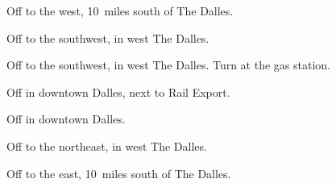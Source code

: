 

\begin{LocationList}

Off  to the west, 10~miles south of The Dalles.

\Location{\GasStation \Gas \Rest}
Off   to the southwest, in west The Dalles.

Off   to the southwest, in west The Dalles.
Turn at the gas station.

Off  in downtown Dalles, next to Rail Export.

Off  in downtown Dalles.

Off   to the northeast, in west The Dalles.

Off  to the east, 10~miles south of The Dalles.

\end{LocationList}
